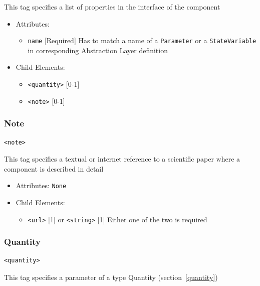 \documentclass{article}
\begin{document}
This tag specifies a list of properties in the interface of the component

\begin{itemize}
\item Attributes:
%
\begin{itemize}
\item \verb|name| {[}Required{]} Has to match a name of a {\tt Parameter}
or a {\tt StateVariable} in corresponding Abstraction Layer definition
\end{itemize}

\item Child Elements:
%
\begin{itemize}
\item \verb|<quantity>| {[}0-1{]}
\item \verb|<note>| {[}0-1{]}
\end{itemize}

\end{itemize}

\subsubsection{Note}
%
\begin{lstlisting}
<note>
\end{lstlisting}

This tag specifies a textual or internet reference to a scientific paper where
a component is described in detail

\begin{itemize}
\item Attributes: \texttt{None}

\item Child Elements:
%
\begin{itemize}
\item \verb|<url>| {[}1{]} or \verb|<string>| {[}1{]} Either one
of the two is required
\end{itemize}

\end{itemize}

\subsubsection{Quantity}
%
\begin{lstlisting}
<quantity>
\end{lstlisting}

This tag specifies a parameter of a type Quantity (section~\ref{quantity})
\end{document}
